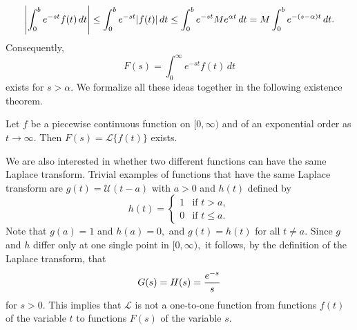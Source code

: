   \[\abs{\int_0^b  e^{-st} f(t) \, dt} \le \int_0^b  e^{-st} \abs{f(t)} \, dt\le \int_0^b  e^{-st} Me^{\alpha t} \, dt =M\int_0^b e^{-(s-\alpha)t}\, dt.\]
Consequently, 
  \[F(s) =\int_0^\infty  e^{-st} f(t) \, dt\] exists for $s>\alpha.$ 
We formalize all these ideas together in the following existence theorem.
 
 \begin{theorem}
 	Let $f$ be a piecewise continuous function on $[0,\infty)$ and of an exponential order as $t\to\infty$.  Then $F(s)=\mathscr{L}\{f(t)\}$ exists.
 \end{theorem}
% 
% 	
% 	
% 	
% 		
% 		

 
 
We are also interested in whether two different functions can have the same Laplace transform.  Trivial examples of functions that have the same Laplace transform are $g(t) =\mathcal U(t-a)$ with  $a>0$ and $h(t)$ defined by
 \[
 h(t) =\begin{cases}
 	1& \text{if } t > a,\\
 	0 & \text{if } t \le a.
 \end{cases}
 \]
 Note that $g(a) = 1$ and $h(a)= 0,$ and  $g(t) = h(t)$ for all $t\ne a.$ Since $g$ and $h$ differ only at one single point in $[0, \infty),$  it follows, by the definition of the Laplace transform, that \[\displaystyle G(s) = H(s) = \frac{e^{-s}}{s}\] for $s>0.$ This implies that \(\mathscr{L}\) is not a one-to-one function from functions \(f(t)\) of the variable \(t\) to functions \(F(s)\) of the variable \(s\).
 
